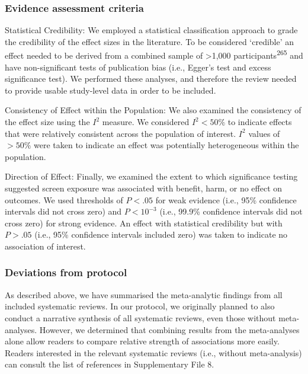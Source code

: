 \documentclass[
  english,
  man]{apa6}
\begin{document}
\hypertarget{evidence-assessment-criteria}{%
\subsubsection{Evidence assessment criteria}\label{evidence-assessment-criteria}}

Statistical Credibility:
We employed a statistical classification approach to grade the credibility of the effect sizes in the literature.
To be considered `credible' an effect needed to be derived from a combined sample of \textgreater1,000 participants\textsuperscript{265} and have non-significant tests of publication bias (i.e., Egger's test and excess significance test).
We performed these analyses, and therefore the review needed to provide usable study-level data in order to be included.

Consistency of Effect within the Population:
We also examined the consistency of the effect size using the \(I^2\) measure.
We considered \(I^2 < 50\%\) to indicate effects that were relatively consistent across the population of interest.
\(I^2\) values of \(> 50\%\) were taken to indicate an effect was potentially heterogeneous within the population.

Direction of Effect:
Finally, we examined the extent to which significance testing suggested screen exposure was associated with benefit, harm, or no effect on outcomes.
We used thresholds of \(P < .05\) for weak evidence (i.e., 95\% confidence intervals did not cross zero) and \(P < 10^{-3}\) (i.e., 99.9\% confidence intervals did not cross zero) for strong evidence.
An effect with statistical credibility but with \(P > .05\) (i.e., 95\% confidence intervals included zero) was taken to indicate no association of interest.

\hypertarget{deviations-from-protocol}{%
\subsubsection{Deviations from protocol}\label{deviations-from-protocol}}

As described above, we have summarised the meta-analytic findings from all included systematic reviews.
In our protocol, we originally planned to also conduct a narrative synthesis of all systematic reviews, even those without meta-analyses.
However, we determined that combining results from the meta-analyses alone allow readers to compare relative strength of associations more easily.
Readers interested in the relevant systematic reviews (i.e., without meta-analysis) can consult the list of references in Supplementary File 8.
\end{document}
